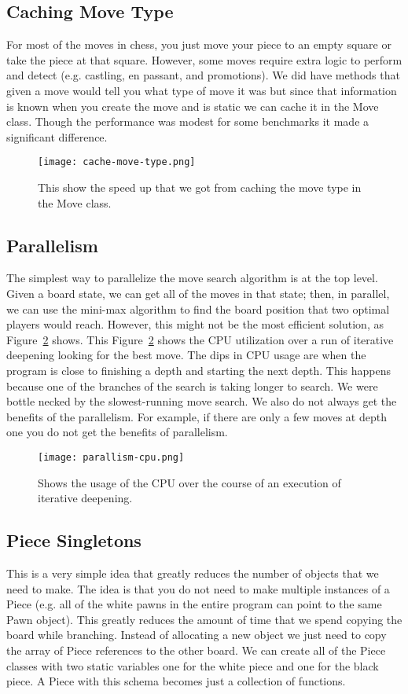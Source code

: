 \documentclass[sigconf]{acmart}
\begin{document}
\subsection{Caching Move Type}
For most of the moves in chess, you just move your piece to an empty square or take the piece at that square.
However, some moves require extra logic to perform and detect (e.g. castling, en passant, and promotions).
We did have methods that given a move would tell you what type of move it was but since that information is known when you create the move and is static we can cache it in the Move class.
Though the performance was modest for some benchmarks it made a significant difference.
\begin{figure}[H]
    \centering
    \texttt{[image: cache-move-type.png]}
    \caption{This show the speed up that we got from caching the move type in the Move class.}
    \label{fig:enter-label}
\end{figure}

\subsection{Parallelism}
The simplest way to parallelize the move search algorithm is at the top level.
Given a board state, we can get all of the moves in that state; then, in parallel, we can use the mini-max algorithm to find the board position that two optimal players would reach. 
However, this might not be the most efficient solution, as Figure~\ref{fig:cpu-trace} shows.
This Figure~\ref{fig:cpu-trace} shows the CPU utilization over a run of iterative deepening looking for the best move.
The dips in CPU usage are when the program is close to finishing a depth and starting the next depth.
This happens because one of the branches of the search is taking longer to search.
We were bottle necked by the slowest-running move search.
We also do not always get the benefits of the parallelism.
For example, if there are only a few moves at depth one you do not get the benefits of parallelism.
\begin{figure}[H]
    \centering
    \texttt{[image: parallism-cpu.png]}
    \caption{Shows the usage of the CPU over the course of an execution of iterative deepening.}
    \label{fig:cpu-trace}
\end{figure}

\subsection{Piece Singletons}
This is a very simple idea that greatly reduces the number of objects that we need to make.
The idea is that you do not need to make multiple instances of a Piece (e.g. all of the white pawns in the entire program can point to the same Pawn object).
This greatly reduces the amount of time that we spend copying the board while branching.
Instead of allocating a new object we just need to copy the array of Piece references to the other board.
We can create all of the Piece classes with two static variables one for the white piece and one for the black piece.
A Piece with this schema becomes just a collection of functions.
\end{document}
